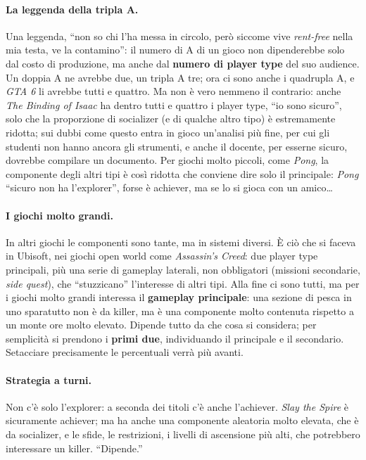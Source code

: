\paragraph{La leggenda della tripla A.} Una leggenda, ``non so chi l'ha messa in
circolo, però siccome vive \emph{rent-free} nella mia testa, ve la contamino'': il
numero di A di un gioco non dipenderebbe solo dal costo di produzione, ma anche dal
\textbf{numero di player type} del suo audience. Un doppia A ne avrebbe due, un
tripla A tre; ora ci sono anche i quadrupla A, e \emph{GTA 6} li avrebbe tutti e
quattro. Ma non è vero nemmeno il contrario: anche \emph{The Binding of Isaac} ha
dentro tutti e quattro i player type, ``io sono sicuro'', solo che la proporzione di
socializer (e di qualche altro tipo) è estremamente ridotta; sui dubbi come questo
entra in gioco un'analisi più fine, per cui gli studenti non hanno ancora gli
strumenti, e anche il docente, per esserne sicuro, dovrebbe compilare un documento.
Per giochi molto piccoli, come \emph{Pong}, la componente degli altri tipi è così
ridotta che conviene dire solo il principale: \emph{Pong} ``sicuro non ha
l'explorer'', forse è achiever, ma se lo si gioca con un amico\dots

\paragraph{I giochi molto grandi.} In altri giochi le componenti sono tante, ma in
sistemi diversi. È ciò che si faceva in Ubisoft, nei giochi open world come
\emph{Assassin's Creed}: due player type principali, più una serie di gameplay
laterali, non obbligatori (missioni secondarie, \emph{side quest}), che
``stuzzicano'' l'interesse di altri tipi. Alla fine ci sono tutti, ma per i giochi
molto grandi interessa il \textbf{gameplay principale}: una sezione di pesca in uno
sparatutto non è da killer, ma è una componente molto contenuta rispetto a un monte
ore molto elevato. Dipende tutto da che cosa si considera; per semplicità si prendono
i \textbf{primi due}, individuando il principale e il secondario. Setacciare
precisamente le percentuali verrà più avanti.

\paragraph{Strategia a turni.} Non c'è solo l'explorer: a seconda dei titoli c'è
anche l'achiever. \emph{Slay the Spire} è sicuramente achiever; ma ha anche una
componente aleatoria molto elevata, che è da socializer, e le sfide, le restrizioni,
i livelli di ascensione più alti, che potrebbero interessare un killer. ``Dipende.''

